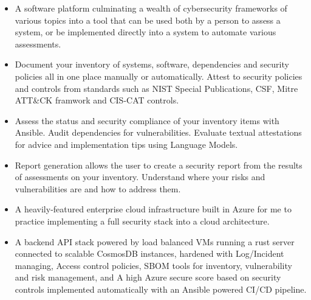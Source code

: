 \documentclass[10pt,a4paper,ragged2e]{altacv}
\begin{document}

\begin{fullwidth}
\makecvheader
\end{fullwidth}


\begin{itemize}
\item A software platform culminating a wealth of cybersecurity frameworks of various topics into a tool that can be used both by a person to assess a system, or be implemented directly into a system to automate various assessments.  
\smallskip
\item Document your inventory of systems, software, dependencies and security policies all in one place manually or automatically. Attest to security policies and controls from standards such as NIST Special Publications, CSF, Mitre ATT\&CK framwork and CIS-CAT controls.
\smallskip
\item Assess the status and security compliance of your inventory items with Ansible. Audit dependencies for vulnerabilities. Evaluate textual attestations for advice and implementation tips using Language Models.  
\smallskip
\item Report generation allows the user to create a security report from the results of assessments on your inventory. Understand where your risks and vulnerabilities are and how to address them. 
\end{itemize}
\smallskip
\smallskip
{}
\begin{itemize}
\item A heavily-featured enterprise cloud infrastructure built in Azure for me to practice implementing a full security stack into a cloud architecture. 
\smallskip
\item A backend API stack powered by load balanced VMs running a rust server connected to scalable CosmosDB instances, hardened with Log/Incident managing, Access control policies, SBOM tools for inventory, vulnerability and risk management, and A high Azure secure score based on security controls implemented automatically with an Ansible powered CI/CD pipeline.  
\end{itemize}
\end{document}
